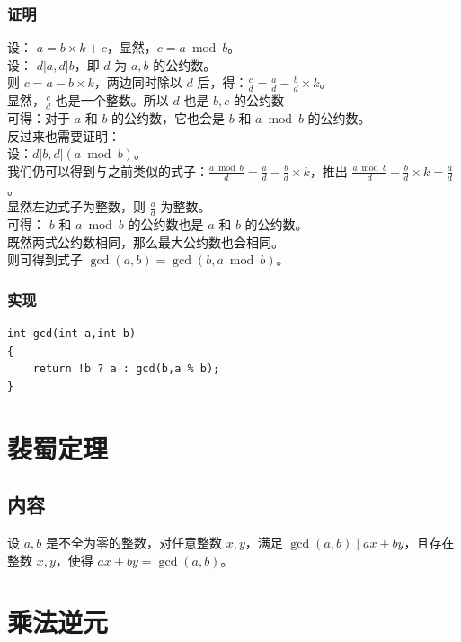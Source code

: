 \documentclass[11pt,oneside,a4paper,UTF8]{book}
\begin{document}
	\subsubsection{证明}
	\noindent
	设： $a = b \times k + c$，显然，$c = a \bmod b$。\\
	设： $d | a,d | b$，即 $d$ 为 $a,b$ 的公约数。\\
	则 $c = a - b \times k$，两边同时除以 $d$ 后，得：$\frac{c}{d} = \frac{a}{d} - \frac{b}{d} \times k$。\\
	显然，$\frac{c}{d}$ 也是一个整数。所以 $d$ 也是 $b,c$ 的公约数\\
	可得：对于 $a$ 和 $b$ 的公约数，它也会是 $b$ 和 $a \bmod b$ 的公约数。\\
	
	\noindent
	反过来也需要证明：\\
	设：$d | b,d | (a \bmod b)$。\\
	我们仍可以得到与之前类似的式子：$\frac{a \bmod b}{d} = \frac{a}{d} - \frac{b}{d} \times k$，推出 $\frac{a \bmod b}{d} + \frac{b}{d} \times k = \frac{a}{d}$。\\
	显然左边式子为整数，则 $\frac{a}{d}$ 为整数。\\
	可得： $b$ 和 $a \bmod b$ 的公约数也是 $a$ 和 $b$ 的公约数。\\
	
	\noindent
	既然两式公约数相同，那么最大公约数也会相同。\\
	则可得到式子 $\gcd(a,b) = \gcd(b,a\bmod b)$。
	
	\subsubsection{实现}
	\begin{lstlisting}
int gcd(int a,int b)
{
	return !b ? a : gcd(b,a % b);
}
	\end{lstlisting}
	
	\section{裴蜀定理}
	\subsection{内容}
	设 $a,b$ 是不全为零的整数，对任意整数 $x,y$，满足 $\gcd(a,b)\mid ax+by$，且存在整数 $x,y$，使得 $ax+by=\gcd(a,b)$。
	\section{乘法逆元}
\end{document}
